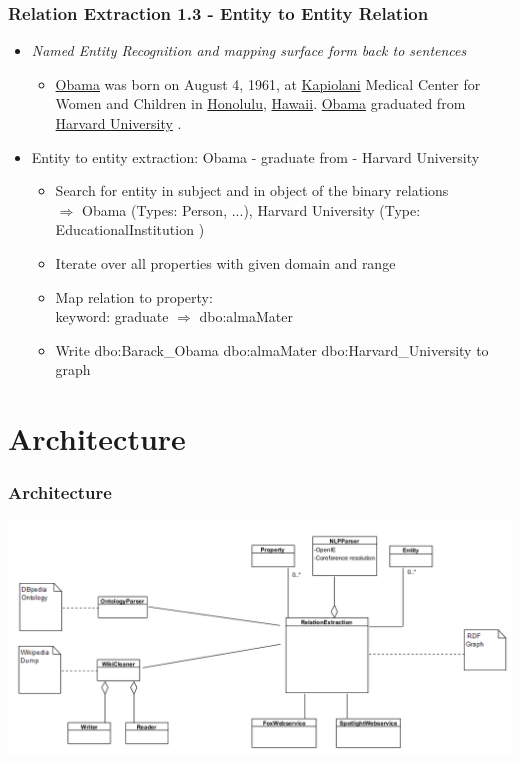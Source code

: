 \documentclass{beamer}
\begin{document}
\begin{frame}
\frametitle{Relation Extraction 1.3 - Entity to Entity Relation}
\begin{example}
\begin{itemize}
\item \textit{Named Entity Recognition and mapping surface form back to sentences} \\
\begin{itemize} \item \underline{Obama} was born on August 4, 1961, at \underline{Kapiolani} Medical Center for Women and Children in \underline{Honolulu}, \underline{Hawaii}. \underline{Obama} graduated from \underline{Harvard University} .
\end{itemize}
\item Entity to entity extraction: Obama - graduate from - Harvard University \begin{itemize} \item Search for entity in subject and in object of the binary relations \\ $\Rightarrow$ Obama (Types: Person, ...), Harvard University (Type: EducationalInstitution )
	\item Iterate over all properties with given domain and range
	\item Map relation to property: \\ keyword: graduate $\Rightarrow$ dbo:almaMater
	\item Write dbo:Barack\_Obama dbo:almaMater dbo:Harvard\_University to graph
\end{itemize}		 

\end{itemize}
\end{example}
\end{frame}


\section{Architecture}

\begin{frame}
\frametitle{Architecture}
\begin{center}
	\includegraphics[scale=0.43]{architecture.PNG}
\end{center}
\end{frame}
\end{document}
